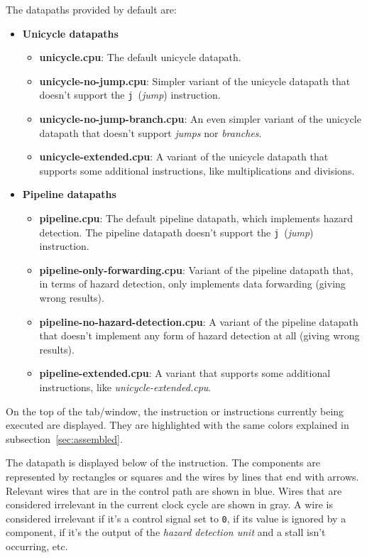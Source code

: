\documentclass[11pt,a4paper,twoside,titlepage]{article}
\begin{document}
The datapaths provided by default are:
\begin{itemize}
	\item \textbf{Unicycle datapaths}
	\begin{itemize}
		\item \textbf{unicycle.cpu}: The default unicycle datapath.
		\item \textbf{unicycle-no-jump.cpu}: Simpler variant of the unicycle 
			datapath that doesn't support the \verb+j+~(\emph{jump}) 
			instruction.
		\item \textbf{unicycle-no-jump-branch.cpu}: An even simpler variant 
			of the unicycle datapath that doesn't support \emph{jumps} nor
			\emph{branches}.
		\item \textbf{unicycle-extended.cpu}: A variant of the unicycle 
			datapath that supports some additional instructions, like 
			multiplications and divisions.
	\end{itemize}
	
	\item \textbf{Pipeline datapaths}
	\begin{itemize}
		\item \textbf{pipeline.cpu}: The default pipeline datapath, which
			implements hazard detection. The pipeline datapath doesn't
			support the \verb+j+~(\emph{jump}) instruction.
		\item \textbf{pipeline-only-forwarding.cpu}: Variant of the pipeline
			datapath that, in terms of hazard detection, only implements
			data forwarding (giving wrong results).
		\item \textbf{pipeline-no-hazard-detection.cpu}: A variant of the
			pipeline datapath that doesn't implement any form of hazard 
			detection at all (giving wrong results).
		\item \textbf{pipeline-extended.cpu}: A variant that supports some
			additional instructions, like \emph{unicycle-extended.cpu}.
	\end{itemize}
\end{itemize}

On the top of the tab/window, the instruction or instructions currently 
being executed are displayed. They are highlighted with the same colors
explained in subsection~\ref{sec:assembled}.

The datapath is displayed below of the instruction.
The components are represented by rectangles or squares and the wires by
lines that end with arrows.
Relevant wires that are in the control path are shown in blue.
Wires that are considered irrelevant in the current clock cycle are shown
in gray.
A wire is considered irrelevant if it's a control signal set to \verb+0+,
if its value is ignored by a component, if it's the output of the
\emph{hazard detection unit} and a stall isn't occurring, etc.
\end{document}
